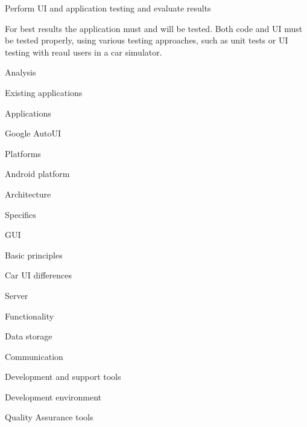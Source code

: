 \secc Perform UI and application testing and evaluate results

For best results the application must and will be tested. Both code and UI must be tested properly, using various testing approaches, such as unit tests or UI testing with reaul users in a car simulator.

\chap Analysis


\sec Existing applications


\secc Applications


\secc Google AutoUI


\sec Platforms


\sec Android platform


\secc Architecture


\secc Specifics


\sec GUI


\secc Basic principles


\secc Car UI differences


\sec Server


\secc Functionality


\secc Data storage


\secc Communication


\sec Development and support tools


\secc Development environment


\secc Quality Assurance tools


